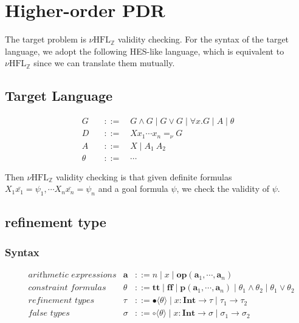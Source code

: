 \documentclass[runningheads]{llncs}
\newcommand \nhz{\(\nu\text{HFL}_\mathbb{Z}\)}
\newcommand \true {\textbf{tt}}
\newcommand \false {\textbf{ff}}
\newcommand \predicate {\textbf{p}}
\newcommand \arith {\textbf{a}}
\newcommand \operator {\mathbin{\textbf{op}}}
\newcommand \atom {A}
\newcommand \goal {G}
\newcommand \definite {D}
\newcommand \stypeint {\textbf{Int}}
\newcommand \stypebool {\bullet}
\newcommand \stypeboolf {\circ}
\newcommand \constraint {\theta}
\newcommand \refty {\tau}
\newcommand \typeint[1]{{#1} : \stypeint}
\newcommand \typebool[1]{\stypebool \langle #1 \rangle}
\newcommand \typeboolf[1]{\stypeboolf \langle #1 \rangle}
\begin{document}
\section{Higher-order PDR}

The target problem is \nhz{} validity checking.
For the syntax of the target language, we adopt the following HES-like language,
which is equivalent to \nhz{} since we can translate them mutually.

\subsection{Target Language}

\begin{align*}
    \goal &\quad ::= \quad
          G \land G
          \mid G \lor G
          \mid \forall x. G
          \mid \atom
          \mid \constraint
         \\
    \definite &\quad ::= \quad X x_1 \cdots x_n =_\nu G
          \\
    \atom &\quad ::= \quad X \mid A_1\ A_2\\
    \constraint &\quad ::= \quad \cdots
\end{align*}


Then \nhz{} validity checking is that given definite formulas
\( X_1 \bar{x_1} = \psi_1, \cdots X_n \bar{x_n} =  \psi_n \)
and a goal formula \( \psi \),
we check the validity of \( \psi \).

\subsection{refinement type}

\subsubsection{Syntax}

\begin{align*}
  &\textit{arithmetic expressions} &
  \arith &::=
  n
  \mid
  x
  \mid
  \operator(\arith_1, \cdots, \arith_n)
  \\
  &\textit{constraint formulas}&
  \constraint &::=
  \true
  \mid \false
  \mid \predicate(\arith_1, \cdots, \arith_n)
  \mid \constraint_1 \land \constraint_2
  \mid \constraint_1 \lor \constraint_2
  \\
  &\textit{refinement types}&
  \refty &::=
  \typebool{\theta}
  \mid \typeint{x} \rightarrow \refty
  \mid \refty_1 \rightarrow \refty_2
  \\
  &\textit{false types}&
  \sigma &::=
  \typeboolf{\theta}
  \mid \typeint{x} \rightarrow \sigma
  \mid \sigma_1 \rightarrow \sigma_2
\end{align*}
\end{document}

